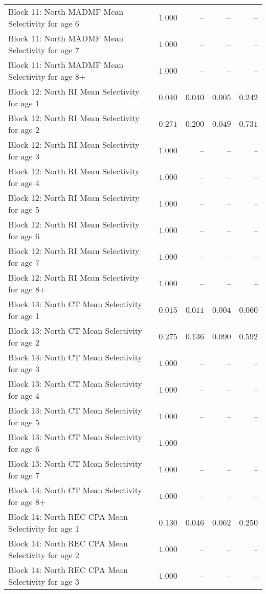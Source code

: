 \documentclass[
]{article}
\begin{document}
\begin{landscape}
\begin{longtable}[t]{lrrrr}
Block 11: North MADMF Mean Selectivity for age 6 & $1.000$ & -- & -- & --\\
Block 11: North MADMF Mean Selectivity for age 7 & $1.000$ & -- & -- & --\\
Block 11: North MADMF Mean Selectivity for age 8+ & $1.000$ & -- & -- & --\\
\addlinespace
Block 12: North RI Mean Selectivity for age 1 & $0.040$ & $0.040$ & $0.005$ & $0.242$\\
Block 12: North RI Mean Selectivity for age 2 & $0.271$ & $0.200$ & $0.049$ & $0.731$\\
Block 12: North RI Mean Selectivity for age 3 & $1.000$ & -- & -- & --\\
Block 12: North RI Mean Selectivity for age 4 & $1.000$ & -- & -- & --\\
Block 12: North RI Mean Selectivity for age 5 & $1.000$ & -- & -- & --\\
\addlinespace
Block 12: North RI Mean Selectivity for age 6 & $1.000$ & -- & -- & --\\
Block 12: North RI Mean Selectivity for age 7 & $1.000$ & -- & -- & --\\
Block 12: North RI Mean Selectivity for age 8+ & $1.000$ & -- & -- & --\\
Block 13: North CT Mean Selectivity for age 1 & $0.015$ & $0.011$ & $0.004$ & $0.060$\\
Block 13: North CT Mean Selectivity for age 2 & $0.275$ & $0.136$ & $0.090$ & $0.592$\\
\addlinespace
Block 13: North CT Mean Selectivity for age 3 & $1.000$ & -- & -- & --\\
Block 13: North CT Mean Selectivity for age 4 & $1.000$ & -- & -- & --\\
Block 13: North CT Mean Selectivity for age 5 & $1.000$ & -- & -- & --\\
Block 13: North CT Mean Selectivity for age 6 & $1.000$ & -- & -- & --\\
Block 13: North CT Mean Selectivity for age 7 & $1.000$ & -- & -- & --\\
\addlinespace
Block 13: North CT Mean Selectivity for age 8+ & $1.000$ & -- & -- & --\\
Block 14: North REC CPA Mean Selectivity for age 1 & $0.130$ & $0.046$ & $0.062$ & $0.250$\\
Block 14: North REC CPA Mean Selectivity for age 2 & $1.000$ & -- & -- & --\\
Block 14: North REC CPA Mean Selectivity for age 3 & $1.000$ & -- & -- & --\\

\end{longtable}
\end{landscape}
\end{document}
